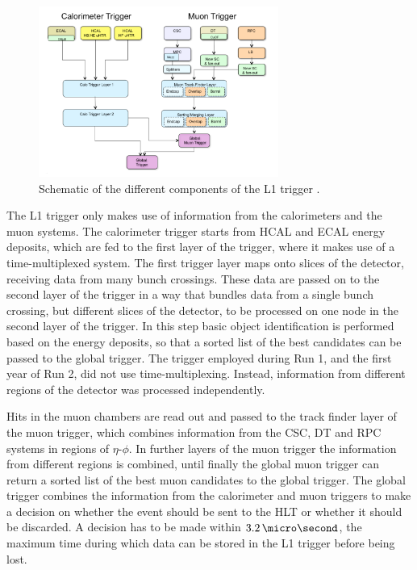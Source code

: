 \begin{figure}[h!]
\begin{center}
\includegraphics[width=0.7\textwidth]{./Detector/Plots/CMSTrigger.png}
\caption[Schematic of the different components of the L1 trigger.]{Schematic of the different components of the \ac{L1} trigger \cite{cms-trigger-tdr}.}
\label{fig:CMS_Trigger}
\end{center}
\end{figure}

The \ac{L1} trigger only makes use of information from the calorimeters and the muon systems.
The calorimeter trigger starts from \ac{HCAL} and \ac{ECAL} energy deposits, 
which are fed to the first layer of the trigger, where it makes use of a time-multiplexed system. 
The first trigger layer maps onto slices of the detector, receiving data from many bunch crossings. These data are passed
on to the second layer of the trigger in a way that bundles data from a single bunch crossing, but
different slices of the detector, to be processed on one node in the second layer of the
trigger. In this step basic object identification is performed based on the energy
deposits, so that a sorted list of the best candidates can be passed to the global trigger.
The trigger employed during Run 1, and the first year of Run 2, did not use time-multiplexing. Instead, 
information from different regions of the detector was processed independently.

Hits in the muon chambers are read out and passed to the track finder layer 
of the muon trigger, which combines information from the \ac{CSC}, \ac{DT}
and \ac{RPC} systems in regions of $\eta$-$\phi$.
In further layers of the muon trigger the information from different
regions is combined, until finally the global muon trigger
can return a sorted list of the best muon candidates to the global trigger.
The global trigger combines the information from the calorimeter and muon triggers
to make a decision on whether the event should be sent to the \ac{HLT} or whether
it should be discarded. A decision has to be made within $3.2\,\micro\second$, the maximum time during
which data can be stored in the \ac{L1} trigger before being lost.


